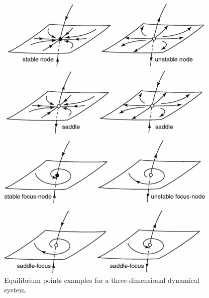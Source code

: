 \begin{minipage}{0.45\linewidth}
\begin{figure}[H]
    \centering
    \includegraphics[width=\linewidth]{Images/3d.png}
    \caption{Equilibrium points examples for a three-dimensional dynamical system.}
    \label{fig:3d}
\end{figure}
\end{minipage}\hspace{10pt}
